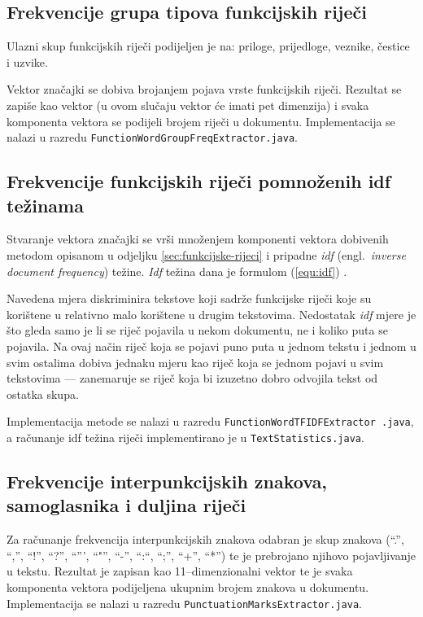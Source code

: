 \documentclass{article}
\newcommand{\engl}[1]{(engl.~\emph{#1})}
\begin{document}
\subsection{Frekvencije grupa tipova funkcijskih riječi}
\label{sec:funkcijske-rijeci-grupe}
Ulazni skup funkcijskih riječi podijeljen je na: priloge, prijedloge, veznike,
čestice i uzvike.

Vektor značajki se dobiva brojanjem pojava vrste funkcijskih riječi. Rezultat
se zapiše kao vektor (u ovom slučaju vektor će imati pet dimenzija) i svaka
komponenta vektora se podijeli brojem riječi u dokumentu. Implementacija se
nalazi u razredu \texttt{FunctionWordGroupFreqExtractor.java}.

\subsection{Frekvencije funkcijskih riječi pomnoženih idf težinama}
\label{sec:funkcijske-rijeci-idf}
Stvaranje vektora značajki se vrši množenjem komponenti vektora dobivenih metodom
opisanom u odjeljku \ref{sec:funkcijske-rijeci} i pripadne \emph{idf} \engl{inverse
document frequency} težine. \emph{Idf} težina dana je formulom (\ref{equ:idf})
\citep{diederich2003authorship}.

Navedena mjera diskriminira tekstove koji sadrže funkcijske riječi koje su
korištene u relativno malo korištene u drugim tekstovima. Nedostatak \emph{idf}
mjere je što gleda samo je li se riječ pojavila u nekom dokumentu, ne i koliko
puta se pojavila. Na ovaj način riječ koja se pojavi puno puta u jednom
tekstu i jednom u svim ostalima dobiva jednaku mjeru kao riječ koja se jednom
pojavi u svim tekstovima --- zanemaruje se riječ koja bi izuzetno dobro
odvojila tekst od ostatka skupa.

Implementacija metode se nalazi u razredu
\texttt{FunctionWordTFIDFExtractor .java}, a računanje idf težina riječi
implementirano je u \texttt{TextStatistics.java}.


\subsection{Frekvencije interpunkcijskih znakova, samoglasnika i duljina riječi}
\label{sec:znacajke-manje}
Za računanje frekvencija interpunkcijskih znakova odabran je skup znakova (``.'',
``,'', ``!'', ``?'', ``''', ``"'', ``-'', ``:``, ``;'', ``+'', ``*'') te je
prebrojano njihovo pojavljivanje u tekstu. Rezultat je zapisan kao
11--dimenzionalni vektor te je svaka komponenta vektora podijeljena ukupnim
brojem znakova u dokumentu. Implementacija se nalazi u razredu
\texttt{PunctuationMarksExtractor.java}.
\end{document}
